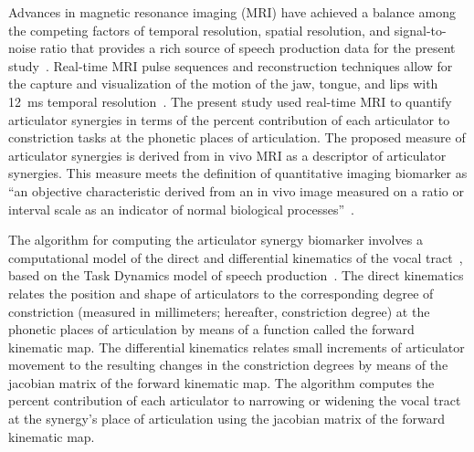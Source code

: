 \documentclass[preprint]{JASAnew}\usepackage[]{graphicx}\usepackage[]{color}
\begin{document}
Advances in magnetic resonance imaging (MRI) have achieved a balance among the competing factors of temporal resolution, spatial resolution, and signal-to-noise ratio that provides a rich source of speech production data for the present study~\citep{scott2014speech}. Real-time MRI pulse sequences and reconstruction techniques allow for the capture and visualization of the motion of the jaw, tongue, and lips with \SI{12}{\milli\second} temporal resolution~\citep{toutios2016advances,lingala2016state}. 
%
The present study used real-time MRI to quantify articulator synergies in terms of the percent contribution of each articulator to constriction tasks at the phonetic places of articulation.
%
The proposed measure of articulator synergies is derived from in vivo MRI as a descriptor of articulator synergies. This measure meets the definition of quantitative imaging biomarker as ``an objective characteristic derived from an in vivo image measured on a ratio or interval scale as an indicator of normal biological processes''~\citep{kessler2015emerging,sullivan2015metrology}. 





The algorithm for computing the articulator synergy biomarker involves a computational model of the direct and differential kinematics of the vocal tract~\citep{lammert2013statistical}, based on the Task Dynamics model of speech production~\citep{saltzman1989dynamical}. 
%
The direct kinematics relates the position and shape of articulators to the corresponding degree of constriction (measured in millimeters; hereafter, constriction degree) at the phonetic places of articulation by means of a function called the forward kinematic map. 
%
The differential kinematics relates small increments of articulator movement to the resulting changes in the constriction degrees by means of the jacobian matrix of the forward kinematic map. 
%
The algorithm computes the percent contribution of each articulator to narrowing or widening the vocal tract at the synergy's place of articulation using the jacobian matrix of the forward kinematic map. 
\end{document}
